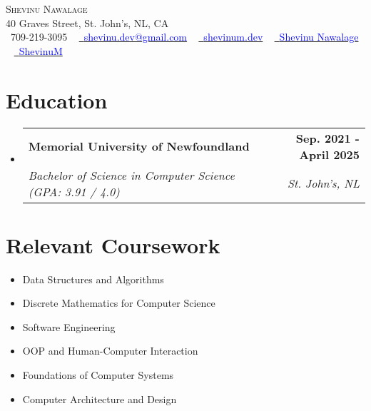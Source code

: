 \documentclass[letterpaper,11pt]{article}
\makeatletter
\newcommand{\resumeSubheading}[4]{
  \vspace{-2pt}\item
    \begin{tabular*}{1.0\textwidth}[t]{l@{\extracolsep{\fill}}r}
      \textbf{#1} & \textbf{\small #2} \\
      \textit{\small#3} & \textit{\small #4} \\
    \end{tabular*}\vspace{-7pt}
}
\newcommand{\resumeSubHeadingListStart}{\begin{itemize}[leftmargin=0.0in, label={}]}
\newcommand{\resumeSubHeadingListEnd}{\end{itemize}}
\makeatother
\begin{document}

\begin{center}
    {\Huge \scshape Shevinu Nawalage} \\ \vspace{5pt}
    40 Graves Street, St. John's, NL, CA \\ \vspace{3pt}
    \small \raisebox{-0.1\height}\faPhone\ 709-219-3095 ~ \href{mailto:shevinu.dev@gmail.com}{\raisebox{-0.2\height}\faEnvelope\  {\textcolor{blue}{shevinu.dev@gmail.com}}} ~ 
    \href{http://shevinum.dev}{\raisebox{-0.2\height}\faGlobe\ {\textcolor{blue}{shevinum.dev}}}  ~
    \href{https://www.linkedin.com/in/shevinu-nawalage-a109371bb/}{\raisebox{-0.2\height}\faLinkedin\ {\textcolor{blue}{Shevinu Nawalage}}}  ~
    \href{https://github.com/ShevinuM}{\raisebox{-0.2\height}\faGithub\ {\textcolor{blue}{ShevinuM}}}
    \vspace{-2pt}
\end{center}


\section{Education}
  \resumeSubHeadingListStart
    \resumeSubheading
      {Memorial University of Newfoundland}{Sep. 2021 - April 2025}
      {Bachelor of Science in Computer Science (GPA: 3.91 / 4.0)}{St. John's, NL}
  \resumeSubHeadingListEnd
  
\section{Relevant Coursework}
        \begin{multicols}{1}
            \begin{itemize}[itemsep=-5pt, parsep=3pt]
                \item\small Data Structures and Algorithms
                \item Discrete Mathematics for Computer Science
                \item Software Engineering 
                \item OOP and Human-Computer Interaction
                \item Foundations of Computer Systems
                \item Computer Architecture and Design
            \end{itemize}
        \end{multicols}
        \vspace*{2.0\multicolsep}
\end{document}
